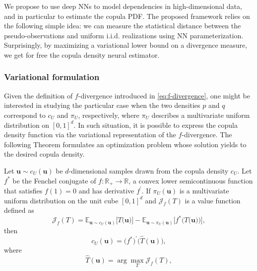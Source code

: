 We propose to use deep NNs to model dependencies in high-dimensional data, and in particular to estimate the copula PDF. The proposed framework relies on the following simple idea: we can measure the statistical distance  between the pseudo-observations and uniform i.i.d. realizations using NN  parameterization. Surprisingly, by maximizing a variational lower bound on a divergence measure, we get for free the copula density neural estimator.

\subsubsection{Variational formulation}
\label{subsec:codine_f-div}
Given the definition of $f$-divergence introduced in \eqref{eq:f-divergence}, one might be interested in studying the particular case when the two densities $p$ and $q$ correspond to $c_U$ and $\pi_U$, respectively, where $\pi_U$ describes a multivariate uniform distribution on $[0,1]^d$. In such situation, it is possible to express the copula density function via the variational representation of the $f$-divergence. The following Theorem formulates an optimization problem whose solution yields to the desired copula density.
 
\begin{theorem}
\label{theorem:codine_theorem1}
Let $\mathbf{u} \sim c_U(\mathbf{u})$ be $d$-dimensional samples drawn from the copula density $c_U$. Let $f^*$ be the Fenchel conjugate of $f:\mathbb{R}_+ \to \mathbb{R}$, a convex lower semicontinuous function that satisfies $f(1)=0$ and has derivative $f^{\prime}$. If $\pi_U(\mathbf{u})$ is a multivariate uniform distribution on the unit cube $[0,1]^d$ and $\mathcal{J}_{f}(T)$ is a value function defined as 
\begin{equation}
\mathcal{J}_{f}(T) = \mathbb{E}_{\mathbf{u} \sim c_{U}(\mathbf{u})}\biggl[T\bigl(\mathbf{u}\bigr)\biggr] -\mathbb{E}_{\mathbf{u} \sim \pi_{U}(\mathbf{u})}\biggl[f^*\biggl(T\bigl(\mathbf{u}\bigr)\biggr)\biggr],
\label{eq:codine_discriminator_function_f}
\end{equation}
then
\begin{equation}
\label{eq:codine_optimal_ratio_T}
c_U(\mathbf{u}) = \bigl(f^{*}\bigr)^{\prime} \bigl(\hat{T}(\mathbf{u})\bigr), 
\end{equation}
where
\begin{equation}
\hat{T}(\mathbf{u}) = \arg \max_T \mathcal{J}_f(T),
\end{equation}
\end{theorem}
 
